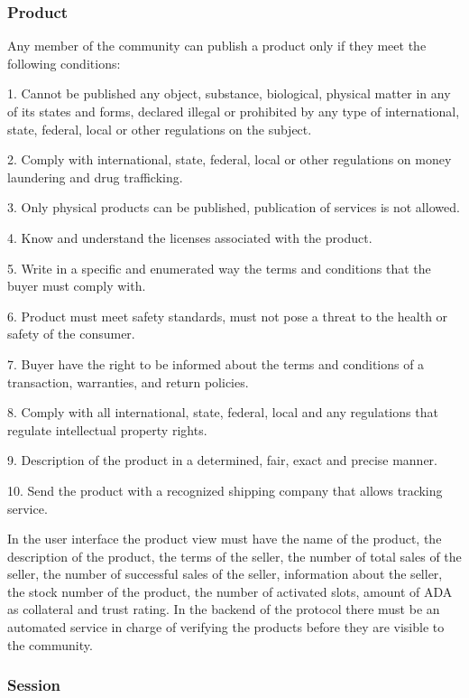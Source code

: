 \documentclass[12pt]{article}
\begin{document}
\subsubsection { Product } 

Any member of the community can publish a product only if they meet the following conditions:

1. Cannot be published any object, substance, biological, physical matter in any of its states and forms, declared illegal or prohibited by any type of international, state, federal, local or other regulations on the subject.

2. Comply with international, state, federal, local or other regulations on money laundering and drug trafficking.

3. Only physical products can be published, publication of services is not allowed.

4. Know and understand the licenses associated with the product.

5. Write in a specific and enumerated way the terms and conditions that the buyer must comply with.

6. Product must meet safety standards, must not pose a threat to the health or safety of the consumer.

7. Buyer have the right to be informed about the terms and conditions of a transaction, warranties, and return policies.

8. Comply with all international, state, federal, local and any regulations that regulate intellectual property rights.

9. Description of the product in a determined, fair, exact and precise manner.

10. Send the product with a recognized shipping company that allows tracking service.

In the user interface the product view must have the name of the product, the description of the product, the terms of the seller, the number of total sales of the seller, the number of successful sales of the seller, information about the seller, the stock number of the product, the number of activated slots, amount of ADA as collateral and trust rating. In the backend of the protocol there must be an automated service in charge of verifying the products before they are visible to the community.


\subsubsection { Session } 
\end{document}
